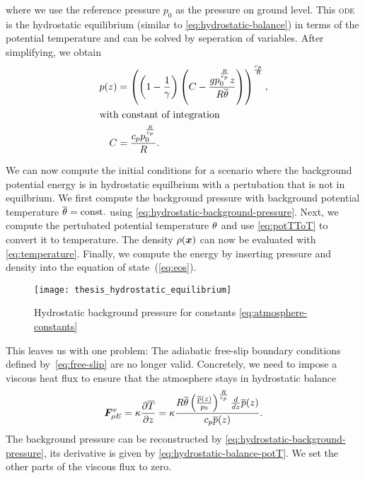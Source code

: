 where we use the reference pressure $p_0$ as the pressure on ground level.
This \textsc{ode} is the hydrostatic equilibrium (similar to \cref{eq:hydrostatic-balance}) in terms of the potential temperature and can be solved by seperation of variables.
After simplifying, we obtain
\begin{align}
  \label{eq:hydrostatic-background-pressure}
p(z) &= \left(\left(1 - \frac{1}{\gamma}\right) \left(C - \frac{g p_{0}^{\frac{R}{c_{p}}} z}{R \overline{\theta}}\right)\right)^{\frac{c_{p}}{R}},\\
\shortintertext{with constant of integration}
 C &= \frac{c_{p} p_{0}^{\frac{R}{c_{p}}}}{R}.
\end{align}

We can now compute the initial conditions for a scenario where the background potential energy is in hydrostatic equilbrium with a pertubation that is not in equilbrium.
We first compute the background pressure with background potential temperature $\overline{\theta} = \text{const.}$ using \cref{eq:hydrostatic-background-pressure}.
Next, we compute the pertubated potential temperature $\theta$ and use \cref{eq:potTToT} to convert it to temperature.
The density $\rho(\bm{x})$ can now be evaluated with \cref{eq:temperature}.
Finally, we compute the energy by inserting pressure and density into the equation of state~(\ref{eq:eos}).

\begin{figure}[tb]
  \centering
  \texttt{[image: thesis\_hydrostatic\_equilibrium]}
  \caption{\label{fig:hydrostatic-p}%
    Hydrostatic background pressure for constants \cref{eq:atmosphere-constants}}
\end{figure}

This leaves us with one problem:
The adiabatic free-slip boundary conditions defined by~\vref{eq:free-slip} are no longer valid.
Concretely, we need to impose a viscous heat flux to ensure that the atmosphere stays in hydrostatic balance~\cite{giraldo2008study}
\begin{equation}
  \label{eq:atmosphere-bc}
  \bm{F}^{v}_{\rho E} = \kappa \pdv{\overline{T}}{z} =
\kappa \frac{R \overline{\theta} \left(\frac{\overline{p}{\left (z \right )}}{p_{0}}\right)^{\frac{R}{c_{p}}} \frac{d}{d z} \overline{p}{\left (z \right )}}{c_{p} \overline{p}{\left (z \right )}}.
\end{equation}
The background pressure can be reconstructed by \cref{eq:hydrostatic-background-pressure}, its derivative is given by \cref{eq:hydrostatic-balance-potT}.
We set the other parts of the viscous flux to zero.

